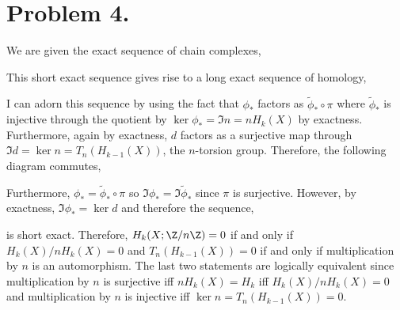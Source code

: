 \documentclass[12pt]{extarticle}
\begin{document}
\section*{Problem 4.}

We are given the exact sequence of chain complexes,
\begin{center}
\end{center}
This short exact sequence gives rise to a long exact sequence of homology,
\begin{center}
\end{center}
I can adorn this sequence by using the fact that $\phi_*$ factors as $\tilde{\phi}_* \circ \pi$ where $\tilde{\phi}_*$ is injective through the quotient by $\ker{\phi_*} = \Im{n} = n H_k(X)$ by exactness. Furthermore, again by exactness, $d$ factors as a surjective map through  $\Im{d} = \ker{n} =  T_n(H_{k-1}(X))$, the $n$-torsion group. Therefore, the following diagram commutes,
\begin{center}
\end{center}
Furthermore, $\phi_* = \tilde{\phi}_* \circ \pi$ so $\Im{\phi_*} = \Im{\tilde{\phi}_*}$ since $\pi$ is surjective. However, by exactness, $\Im{\phi_*} = \ker{d}$ and therefore the sequence,
\begin{center}
\end{center}
is short exact. Therefore, $H_k(X ; \Z / n \Z) = 0$ if and only if $H_{k}(X) / n H_k(X) = 0$ and $T_n(H_{k-1}(X)) = 0$ if and only if multiplication by $n$ is an automorphism. The last two statements are logically equivalent since multiplication by $n$ is surjective iff $n H_k(X) = H_k$ iff $H_k(X) / n H_k(X) = 0$ and multiplication by $n$ is injective iff $\ker{n} = T_n(H_{k-1}(X)) = 0$. 
\end{document}
